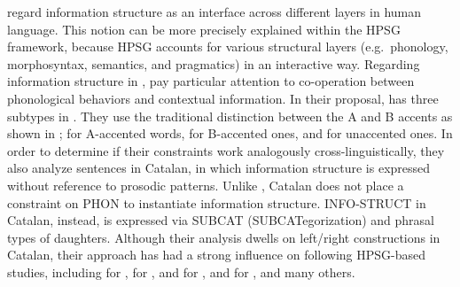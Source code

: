 

\citet{engdahl:vallduvi:96} regard information structure as an
interface across different layers in human language.  This notion can
be more precisely explained within the HPSG framework, because HPSG
accounts for various structural layers (e.g.\ phonology,
morphosyntax, semantics, and pragmatics) in an interactive
way. Regarding information structure in ,
\citeauthor{engdahl:vallduvi:96} pay particular attention to
co-operation between phonological behaviors and contextual
information.  In their proposal,  has three subtypes in
. They use the traditional distinction between the A and
B accents as shown in 
\citep{bolinger:58,jackendoff:72};  for A-accented words,
 for B-accented ones, and  for unaccented
ones. In order to determine if their
constraints work analogously cross-linguistically, they also analyze
sentences in Catalan, in which information structure is expressed
without reference to prosodic patterns. Unlike , Catalan
does not place a constraint on PHON to instantiate information
structure. INFO-STRUCT in Catalan, instead, is expressed via SUBCAT
(SUBCATegorization) and phrasal types of daughters.  Although their
analysis dwells on left/right  constructions in
Catalan, their approach has had a strong influence on following
HPSG-based studies, including \citet{dekuthy:00} for ,
\citet{bildhauer:07} for , \citet{chang:02} and
\citet{chung:etal:03} for , \citet{ohtani:matsumoto:04}
and \citet{yoshimoto:etal:06} for , and many
others. 


